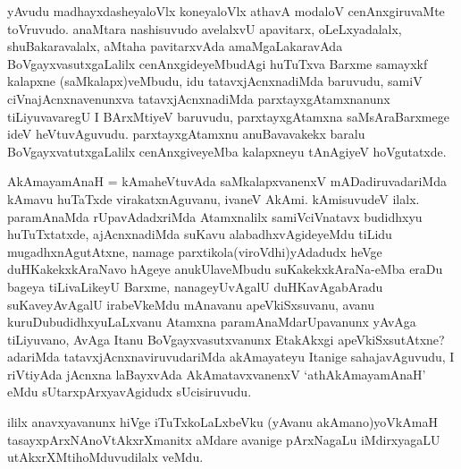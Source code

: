 \begin{artha}
yAvudu madhayxdasheyaloVlx koneyaloVlx athavA modaloV cenAnxgiruvaMte toVruvudo. anaMtara nashisuvudo avelalxvU apavitarx, oLeLxyadalalx, shuBakaravalalx, aMtaha pavitarxvAda amaMgaLakaravAda BoVgayxvasutxgaLalilx cenAnxgideyeMbudAgi huTuTxva Barxme samayxkf kalapxne (saMkalapx)veMbudu, idu tatavxjAcnxnadiMda baruvudu, samiV ciVnajAcnxnavenunxva tatavxjAcnxnadiMda parxtayxgAtamxnanunx tiLiyuvavaregU I BArxMtiyeV baruvudu, parxtayxgAtamxna saMsAraBarxmege ideV heVtuvAguvudu. parxtayxgAtamxnu anuBavavakekx baralu BoVgayxvatutxgaLalilx cenAnxgiveyeMba kalapxneyu tAnAgiyeV hoVgutatxde.
\end{artha}

\begin{artha}
AkAmayamAnaH = kAmaheVtuvAda saMkalapxvanenxV mADadiruvadariMda kAmavu huTaTxde virakatxnAguvanu, ivaneV AkAmi. kAmisuvudeV ilalx. paramAnaMda rUpavAdadxriMda Atamxnalilx samiVciVnatavx budidhxyu huTuTxtatxde, ajAcnxnadiMda suKavu alabadhxvAgideyeMdu tiLidu mugadhxnAgutAtxne, namage parxtikola(viroVdhi)yAdadudx heVge duHKakekxkAraNavo hAgeye anukUlaveMbudu suKakekxkAraNa-eMba eraDu bageya tiLivaLikeyU Barxme, nanageyUvAgalU duHKavAgabAradu suKaveyAvAgalU irabeVkeMdu mAnavanu apeVkiSxsuvanu, avanu kuruDubudidhxyuLaLxvanu Atamxna paramAnaMdarUpavanunx yAvAga tiLiyuvano, AvAga Itanu BoVgayxvasutxvanunx EtakAkxgi apeVkiSxsutAtxne? adariMda tatavxjAcnxnaviruvudariMda akAmayateyu Itanige sahajavAguvudu, I riVtiyAda jAcnxna laBayxvAda AkAmatavxvanenxV `athAkAmayamAnaH' eMdu sUtarxpArxyavAgidudx sUcisiruvudu. 
\end{artha}

\begin{artha}
ililx anavxyavanunx hiVge iTuTxkoLaLxbeVku (yAvanu akAmano)yoV\s kAmaH tasayxpArxNAnoVtAkxrXmanitx aMdare avanige pArxNagaLu iMdirxyagaLU utAkxrXMtihoMduvudilalx veMdu.
\end{artha}

